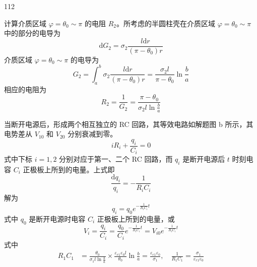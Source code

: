 \begin{solution}{112}
\begin{subsolution}
        计算介质区域 $\varphi = \theta_{0} \sim \pi$ 的电阻 $R_{2}$。所考虑的半圆柱壳在介质区域 $\varphi = \theta_{0} \sim \pi$ 中的部分的电导为
        \begin{equation}
            \mathrm{d} G_{2} = \sigma_{2} \frac{l \mathrm{d} r}{(\pi - \theta_{0}) r}
        \end{equation}
        介质区域 $\varphi = \theta_{0} \sim \pi$ 的电导为
        \begin{equation}
            G_{2} = \int_{a}^{b} \sigma_{2} \frac{l \mathrm{d} r}{(\pi - \theta_{0}) r} = \frac{\sigma_{2} l}{\pi - \theta_{0}} \ln \frac{b}{a}
        \end{equation}
        相应的电阻为
        \begin{equation}
            R_{2} = \frac{1}{G_{2}} = \frac{\pi - \theta_{0}}{\sigma_{2} l \ln \frac{b}{a}}
            \label{eq:18.s112}
        \end{equation}
    \end{subsolution}
    \begin{subsolution}
        当断开电源后，形成两个相互独立的 RC 回路，其等效电路如解题图 b 所示，其电势差从 $V_{10}$ 和 $V_{20}$ 分别衰减到零。
        \begin{equation}
            i R_{i} + \frac{q_{i}}{C_{i}} = 0
        \end{equation}
        式中下标 $i=1,2$ 分别对应于第一、二个 RC 回路，而 $q_{i}$ 是断开电源后 $t$ 时刻电容 $C_{i}$ 正极板上所到的电量。上式即
        \begin{equation}
            \frac{\mathrm{d} q_{i}}{q_{i}} = - \frac{1}{R_{i} C_{i}}
        \end{equation}
        解为
        \begin{equation}
            q_{i} = q_{0} e^{- \frac{1}{R_{i} C_{i}} t}
        \end{equation}
        式中 $q_{0}$ 是断开电源时电容 $C_{i}$ 正极板上所到的电量，或
        \begin{equation}
            V_{i} = \frac{q_{i}}{C_{i}} = \frac{q_{0}}{C_{i}} e^{- \frac{1}{R_{i} C_{i}} t} = V_{i0} e^{- \frac{1}{R_{i} C_{i}} t}
            \label{eq:19.s112}
        \end{equation}
        式中
        \begin{align}
            R_{1} C_{1} &= \frac{\theta_{0}}{\sigma_{1} l \ln \frac{b}{a}} \times \frac{\varepsilon_{r1} \varepsilon_{0} l}{\theta_{0}} \ln \frac{b}{a} = \frac{\varepsilon_{r1} \varepsilon_{0}}{\sigma_{1}}, \quad \frac{1}{R_{1} C_{1}} = \frac{\sigma_{1}}{\varepsilon_{r1} \varepsilon_{0}} \label{eq:20.s112} \\

\end{align}
\end{subsolution}
\end{solution}

